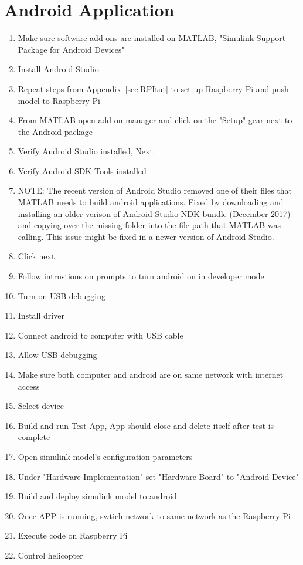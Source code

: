 \section{Android Application}
\begin{enumerate}
    \item Make sure software add ons are installed on MATLAB, "Simulink Support Package for Android Devices"
    \item Install Android Studio
    \item Repeat steps from Appendix~\ref{sec:RPItut} to set up Raspberry Pi and push model to Raspberry Pi
    \item From MATLAB open add on manager and click on the "Setup" gear next to the Android package
    \item Verify Android Studio installed, Next
    \item Verify Android SDK Tools installed
    \item NOTE: The recent version of Android Studio removed one of their files that MATLAB needs to build android applications.  Fixed by downloading and installing an older verison of Android Studio NDK bundle (December 2017) and copying over the missing folder into the file path that MATLAB was calling.  This issue might be fixed in a newer version of Android Studio. 
    \item Click next
    \item Follow intrustions on prompts to turn android on in developer mode
    \item Turn on USB debugging
    \item Install driver
    \item Connect android to computer with USB cable
    \item Allow USB debugging
    \item Make sure both computer and android are on same network with internet access
    \item Select device
    \item Build and run Test App, App should close and delete itself after test is complete
    \item Open simulink model's configuration parameters
    \item Under "Hardware Implementation" set "Hardware Board" to "Android Device"
    \item Build and deploy simulink model to android
    \item Once APP is running, swtich network to same network as the Raspberry Pi
    \item Execute code on Raspberry Pi
    \item Control helicopter
\end{enumerate}

